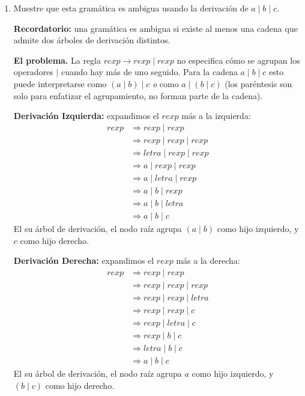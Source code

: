 \documentclass[12pt,letterpaper]{article}
\begin{document}
\begin{enumerate}[label=\arabic*.]
  \begin{enumerate}[label=\alph*.]

  \item Muestre que esta gramática es ambigua usando la derivación de $a\mid b\mid c$.

    \textbf{Recordatorio:} una gramática es ambigua si existe al menos una cadena que admite
    dos árboles de derivación distintos.

    \medskip
    \textbf{El problema.} La regla $rexp \to rexp \mid rexp$ no especifica cómo se agrupan los
    operadores $\mid$ cuando hay más de uno seguido. Para la cadena $a\mid b\mid c$ esto puede
    interpretarse como $(a\mid b)\mid c$ \emph{o} como $a\mid(b\mid c)$ (los paréntesis son solo
    para enfatizar el agrupamiento, no forman parte de la cadena).

    \medskip
    \textbf{Derivación Izquierda:} expandimos el $rexp$ más a la izquierda:
    \[
    \begin{aligned}
      rexp &\Rightarrow rexp \mid rexp \\
      &\Rightarrow rexp \mid rexp \mid rexp \\
      &\Rightarrow letra \mid rexp \mid rexp \\
      &\Rightarrow a \mid rexp \mid rexp \\
      &\Rightarrow a \mid letra \mid rexp \\
      &\Rightarrow a \mid b \mid rexp \\
      &\Rightarrow a \mid b \mid letra \\
      &\Rightarrow a\mid b\mid c
    \end{aligned}
    \]
    El su árbol de derivación, el nodo raíz agrupa $(a\mid b)$ como hijo izquierdo, y $c$ como hijo derecho.

    \textbf{Derivación Derecha:} expandimos el $rexp$ más a la derecha:
    \[
    \begin{aligned}
      rexp &\Rightarrow rexp \mid rexp \\
      &\Rightarrow rexp \mid rexp \mid rexp \\
      &\Rightarrow rexp \mid rexp \mid letra \\
      &\Rightarrow rexp \mid rexp \mid c \\
      &\Rightarrow rexp \mid letra \mid c \\
      &\Rightarrow rexp \mid b \mid c \\
      &\Rightarrow letra \mid b \mid c \\
      &\Rightarrow a\mid b\mid c
    \end{aligned}
    \]
    El su árbol de derivación, el nodo raíz agrupa $a$ como hijo izquierdo, y $(b\mid c)$ como hijo derecho.\\


\end{enumerate}
\end{enumerate}
\end{document}
